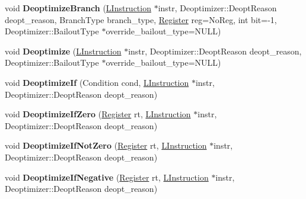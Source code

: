 \begin{DoxyCompactItemize}
\item 
void {\bfseries Deoptimize\+Branch} (\hyperlink{classv8_1_1internal_1_1_l_instruction}{L\+Instruction} $\ast$instr, Deoptimizer\+::\+Deopt\+Reason deopt\+\_\+reason, Branch\+Type branch\+\_\+type, \hyperlink{structv8_1_1internal_1_1_register}{Register} reg=No\+Reg, int bit=-\/1, Deoptimizer\+::\+Bailout\+Type $\ast$override\+\_\+bailout\+\_\+type=N\+U\+LL)\hypertarget{classv8_1_1internal_1_1_l_code_gen_a090e09902eb4a2a12ebd16456702df0b}{}\label{classv8_1_1internal_1_1_l_code_gen_a090e09902eb4a2a12ebd16456702df0b}

\item 
void {\bfseries Deoptimize} (\hyperlink{classv8_1_1internal_1_1_l_instruction}{L\+Instruction} $\ast$instr, Deoptimizer\+::\+Deopt\+Reason deopt\+\_\+reason, Deoptimizer\+::\+Bailout\+Type $\ast$override\+\_\+bailout\+\_\+type=N\+U\+LL)\hypertarget{classv8_1_1internal_1_1_l_code_gen_aed358f45305957188b1086575c48ec7a}{}\label{classv8_1_1internal_1_1_l_code_gen_aed358f45305957188b1086575c48ec7a}

\item 
void {\bfseries Deoptimize\+If} (Condition cond, \hyperlink{classv8_1_1internal_1_1_l_instruction}{L\+Instruction} $\ast$instr, Deoptimizer\+::\+Deopt\+Reason deopt\+\_\+reason)\hypertarget{classv8_1_1internal_1_1_l_code_gen_a2b8d145db6df035a74548839e8e8c577}{}\label{classv8_1_1internal_1_1_l_code_gen_a2b8d145db6df035a74548839e8e8c577}

\item 
void {\bfseries Deoptimize\+If\+Zero} (\hyperlink{structv8_1_1internal_1_1_register}{Register} rt, \hyperlink{classv8_1_1internal_1_1_l_instruction}{L\+Instruction} $\ast$instr, Deoptimizer\+::\+Deopt\+Reason deopt\+\_\+reason)\hypertarget{classv8_1_1internal_1_1_l_code_gen_ad9ae533b3781f4445e938185a9e0579f}{}\label{classv8_1_1internal_1_1_l_code_gen_ad9ae533b3781f4445e938185a9e0579f}

\item 
void {\bfseries Deoptimize\+If\+Not\+Zero} (\hyperlink{structv8_1_1internal_1_1_register}{Register} rt, \hyperlink{classv8_1_1internal_1_1_l_instruction}{L\+Instruction} $\ast$instr, Deoptimizer\+::\+Deopt\+Reason deopt\+\_\+reason)\hypertarget{classv8_1_1internal_1_1_l_code_gen_aa4d0a92e09bdbde044858ebeb592ffa4}{}\label{classv8_1_1internal_1_1_l_code_gen_aa4d0a92e09bdbde044858ebeb592ffa4}

\item 
void {\bfseries Deoptimize\+If\+Negative} (\hyperlink{structv8_1_1internal_1_1_register}{Register} rt, \hyperlink{classv8_1_1internal_1_1_l_instruction}{L\+Instruction} $\ast$instr, Deoptimizer\+::\+Deopt\+Reason deopt\+\_\+reason)\hypertarget{classv8_1_1internal_1_1_l_code_gen_a56637384d5fe14c0ba61b2044ee4163b}{}\label{classv8_1_1internal_1_1_l_code_gen_a56637384d5fe14c0ba61b2044ee4163b}


\end{DoxyCompactItemize}
